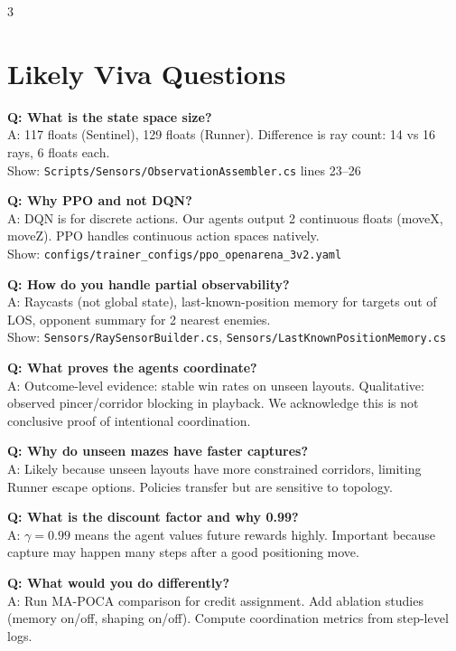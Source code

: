 \documentclass[10pt,landscape,a4paper]{article}
\begin{document}
\begin{multicols}{3}
\section{Likely Viva Questions}

\textbf{Q: What is the state space size?} \\
A: 117 floats (Sentinel), 129 floats (Runner). Difference is ray count: 14 vs 16 rays, 6 floats each. \\
{\scriptsize\color{gray} Show: \texttt{Scripts/Sensors/ObservationAssembler.cs} lines 23--26}

\textbf{Q: Why PPO and not DQN?} \\
A: DQN is for discrete actions. Our agents output 2 continuous floats (moveX, moveZ). PPO handles continuous action spaces natively. \\
{\scriptsize\color{gray} Show: \texttt{configs/trainer\_configs/ppo\_openarena\_3v2.yaml}}

\textbf{Q: How do you handle partial observability?} \\
A: Raycasts (not global state), last-known-position memory for targets out of LOS, opponent summary for 2 nearest enemies. \\
{\scriptsize\color{gray} Show: \texttt{Sensors/RaySensorBuilder.cs}, \texttt{Sensors/LastKnownPositionMemory.cs}}

\textbf{Q: What proves the agents coordinate?} \\
A: Outcome-level evidence: stable win rates on unseen layouts. Qualitative: observed pincer/corridor blocking in playback. We acknowledge this is not conclusive proof of intentional coordination.

\textbf{Q: Why do unseen mazes have faster captures?} \\
A: Likely because unseen layouts have more constrained corridors, limiting Runner escape options. Policies transfer but are sensitive to topology.

\textbf{Q: What is the discount factor and why 0.99?} \\
A: $\gamma = 0.99$ means the agent values future rewards highly. Important because capture may happen many steps after a good positioning move.

\textbf{Q: What would you do differently?} \\
A: Run MA-POCA comparison for credit assignment. Add ablation studies (memory on/off, shaping on/off). Compute coordination metrics from step-level logs.


\end{multicols}
\end{document}
